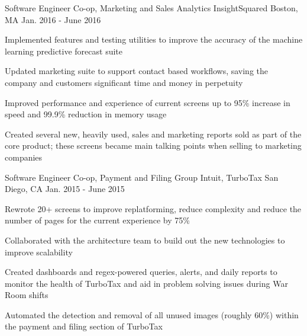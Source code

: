 \begin{cventries}


  \cventry
    {Software Engineer Co-op, Marketing and Sales Analytics} %
    {InsightSquared} %
    {Boston, MA} %
    {Jan. 2016 - June 2016} %
    {
      \begin{cvitems} %
        \item {Implemented features and testing utilities to improve the accuracy of the machine learning predictive forecast suite}
        \item {Updated marketing suite to support contact based workflows, saving the company and customers significant time and money in perpetuity}
        \item {Improved performance and experience of current screens up to 95\% increase in speed and 99.9\% reduction in memory usage}
        \item {Created several new, heavily used, sales and marketing reports sold as part of the core product; these screens became main talking points when selling to marketing companies}
      \end{cvitems}
    }

  \cventry
    {Software Engineer Co-op, Payment and Filing Group} %
    {Intuit, TurboTax} %
    {San Diego, CA} %
    {Jan. 2015 - June 2015} %
    {
      \begin{cvitems} %
        \item {Rewrote 20+ screens to improve replatforming, reduce complexity and reduce the number of pages for the current experience by 75\%}
        \item {Collaborated with the architecture team to build out the new technologies to improve scalability}
        \item {Created dashboards and regex-powered queries, alerts, and daily reports to monitor the health of TurboTax and aid in problem solving issues during War Room shifts}
        \item {Automated the detection and removal of all unused images (roughly 60\%) within the payment and filing section of TurboTax}
      \end{cvitems}
    }


\end{cventries}
